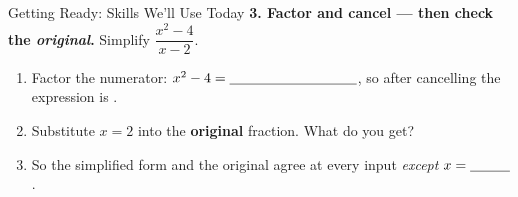 \documentclass[10pt]{article}
\begin{document}
\begin{notesbox}{Getting Ready: Skills We'll Use Today}
\vspace{4pt}
\textbf{3. Factor and cancel --- then check the \emph{original}.} Simplify
$\dfrac{x^2-4}{x-2}$.
\begin{enumerate}[label=(\alph*), leftmargin=2.1em, itemsep=3pt]
  \item Factor the numerator: $x^2-4=\blank{3.2cm}$, \; so after cancelling the expression is
        \blank{2.2cm}.
  \item Substitute $x=2$ into the \textbf{original} fraction. What do you get? \blank{4.4cm}
  \item So the simplified form and the original agree at every input \emph{except}
        $x=\blank{1.0cm}$.
\end{enumerate}

\end{notesbox}
\end{document}
